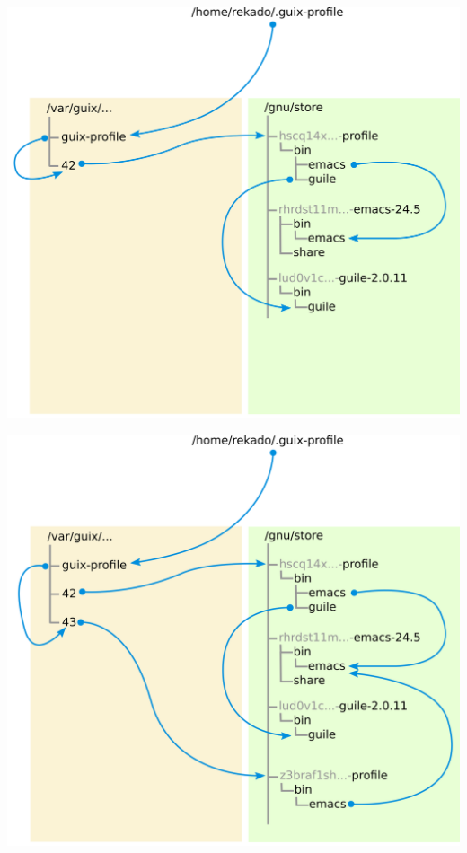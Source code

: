 \documentclass{beamer}
\begin{document}
\begin{frame}[plain]
  \begin{center}
    \includegraphics[height=\textheight]{images/profile-1}
  \end{center}
\end{frame}
\begin{frame}[plain]
  \begin{center}
    \includegraphics[height=\textheight]{images/profile-2}
  \end{center}
\end{frame}
\end{document}
